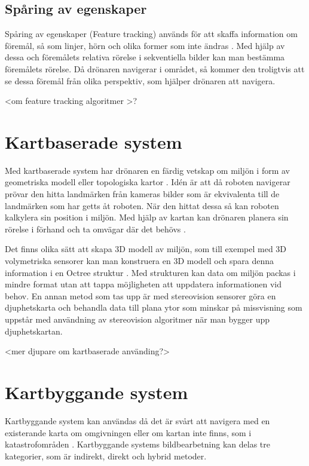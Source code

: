 \subsection{Spåring av egenskaper}

Spåring av egenskaper (Feature tracking) används för att skaffa information om föremål, så som linjer, hörn och olika former som inte ändras \citep{geospatial}. Med hjälp av dessa och föremålets relativa rörelse i sekventiella bilder kan man bestämma föremålets rörelse. Då drönaren navigerar i området, så kommer den troligtvis att se dessa föremål från olika perspektiv, som hjälper drönaren att navigera.

<om feature tracking algoritmer \citep{8930783}>?

\section{Kartbaserade system}

Med kartbaserade system har drönaren en färdig vetskap om miljön i form av geometriska modell eller topologiska kartor \citep{982903}. Idén är att då roboten navigerar prövar den hitta landmärken från kameras bilder som är ekvivalenta till de landmärken som har getts åt roboten. När den hittat dessa så kan roboten kalkylera sin position i miljön. Med hjälp av kartan kan drönaren planera sin rörelse i förhand och ta omvägar där det behövs \citep{geospatial}. 

Det finns olika sätt att skapa 3D modell av miljön, som till exempel med 3D volymetriska sensorer kan man konstruera en 3D modell och spara denna information i en Octree struktur \citep{geospatial}. Med strukturen kan data om miljön packas i mindre format utan att tappa möjligheten att uppdatera informationen vid behov. En annan metod som tas upp är med stereovision sensorer göra en djuphetskarta och behandla data till plana ytor som minskar på missvisning som uppstår med användning av stereovision algoritmer när man bygger upp djuphetskartan.

<mer djupare om kartbaserade använding?>

\section{Kartbyggande system}

Kartbyggande system kan användas då det är svårt att navigera med en existerande karta om omgivningen eller om kartan inte finns, som i katastrofområden \citep{geospatial}. Kartbyggande systems bildbearbetning kan delas tre kategorier, som är indirekt, direkt och hybrid metoder.

